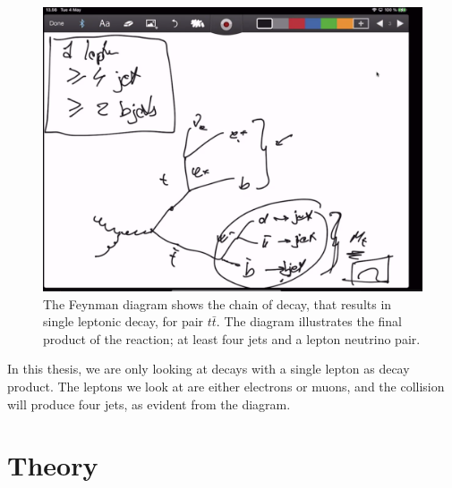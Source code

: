 \documentclass[12pt,a4paper]{article}
\numberwithin{equation}{section}
\begin{document}
\begin{figure}[H]
	\includegraphics[width=\linewidth]{figures/placeholder_feynman_singlelep.png}
	\caption{The Feynman diagram shows the chain of decay, that results in single
    leptonic decay, for pair $t\bar t$. The diagram illustrates the final
    product of the reaction; at least four jets and a lepton neutrino
    pair.}\label{fig:feynmandiagram}
\end{figure}

In this thesis, we are only looking at decays with a single lepton as decay
product. The leptons we look at are either electrons or muons, and the collision
will produce four jets, as evident from the diagram.

\section{Theory}
\end{document}
